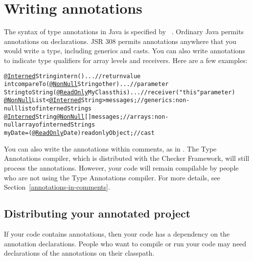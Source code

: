 

\section{Writing annotations\label{writing-annotations}}

The syntax of type annotations in Java is specified by
~\cite{JSR308-2008-09-12}.  Ordinary
Java permits annotations on declarations.  JSR 308 permits annotations
anywhere that you would write a type, including generics and casts.  You
can also write annotations to indicate type qualifiers for array levels and
receivers.  Here are a few examples:

\begin{alltt}
  \underline{@Interned} String intern() \ttlcb{} ... \ttrcb{}               // return value
  int compareTo(\underline{@NonNull} String other) \ttlcb{} ... \ttrcb{}    // parameter
  String toString(\underline{@ReadOnly} MyClass this) \ttlcb{} ... \ttrcb{} // receiver ("this" parameter)
  \underline{@NonNull} List<\underline{@Interned} String> messages;       // generics:  non-null list of interned Strings
  \underline{@Interned} String \underline{@NonNull} [] messages;          // arrays:  non-null array of interned Strings
  myDate = (\underline{@ReadOnly} Date) readonlyObject;       // cast
\end{alltt}

You can also write the annotations within comments, as in
.  The Type Annotations compiler, which is
distributed with the Checker Framework, will still process
the annotations.
However, your code will remain compilable by people who are not using the
Type Annotations compiler.  For more details, see
Section~\ref{annotations-in-comments}.



\subsection{Distributing your annotated project\label{distributing}}

If your code contains annotations, then your code has a dependency on the
annotation declarations.  People who want to compile or run your code may
need declarations of the annotations on their classpath.

